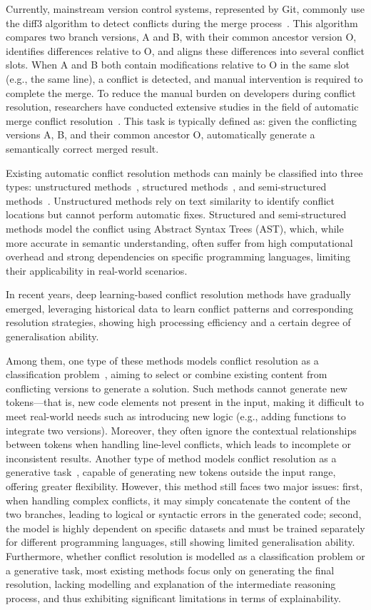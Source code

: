 \documentclass[sigconf,review,anonymous]{acmart}
\begin{document}
Currently, mainstream version control systems, represented by Git, commonly use the diff3 algorithm to detect conflicts during the merge process~\cite{4}. This algorithm compares two branch versions, A and B, with their common ancestor version O, identifies differences relative to O, and aligns these differences into several conflict slots.
When A and B both contain modifications relative to O in the same slot (e.g., the same line), a conflict is detected, and manual intervention is required to complete the merge. To reduce the manual burden on developers during conflict resolution, researchers have conducted extensive studies in the field of automatic merge conflict resolution~\cite{5, 6, Sousa, 8}. This task is typically defined as: given the conflicting versions A, B, and their common ancestor O, automatically generate a semantically correct merged result.

Existing automatic conflict resolution methods can mainly be classified into three types: unstructured methods~\cite{9}, structured methods~\cite{10, 11, 6}, and semi-structured methods~\cite{13}. Unstructured methods rely on text similarity to identify conflict locations but cannot perform automatic fixes. Structured and semi-structured methods model the conflict using Abstract Syntax Trees (AST), which, while more accurate in semantic understanding, often suffer from high computational overhead and strong dependencies on specific programming languages, limiting their applicability in real-world scenarios.

In recent years, deep learning-based conflict resolution methods have gradually emerged, leveraging historical data to learn conflict patterns and corresponding resolution strategies, showing high processing efficiency and a certain degree of generalisation ability. 

Among them, one type of these methods models conflict resolution as a classification problem~\cite{mergebert}, aiming to select or combine existing content from conflicting versions to generate a solution. 
Such methods cannot generate new tokens—that is, new code elements not present in the input, making it difficult to meet real-world needs such as introducing new logic (e.g., adding functions to integrate two versions). Moreover, they often ignore the contextual relationships between tokens when handling line-level conflicts, which leads to incomplete or inconsistent results.
Another type of method models conflict resolution as a generative task~\cite{mergegen}, capable of generating new tokens outside the input range, offering greater flexibility. However, this method still faces two major issues: first, when handling complex conflicts, it may simply concatenate the content of the two branches, leading to logical or syntactic errors in the generated code; second, the model is highly dependent on specific datasets and must be trained separately for different programming languages, still showing limited generalisation ability. Furthermore, whether conflict resolution is modelled as a classification problem or a generative task, most existing methods focus only on generating the final resolution, lacking modelling and explanation of the intermediate reasoning process, and thus exhibiting significant limitations in terms of explainability.
\end{document}
